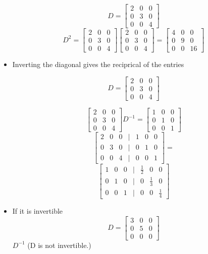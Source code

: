 \begin{itemize}
		\[D = \begin{bmatrix} 2 & 0 & 0 \\ 0 & 3 & 0 \\ 0 & 0 & 4 \end{bmatrix} \]
		\[D^2 = \begin{bmatrix} 2 & 0 & 0 \\ 0 & 3 & 0 \\ 0 & 0 & 4 \end{bmatrix}
		\begin{bmatrix} 2 & 0 & 0 \\ 0 & 3 & 0 \\ 0 & 0 & 4 \end{bmatrix}=
		\begin{bmatrix} 4 & 0 & 0 \\ 0 & 9 & 0 \\ 0 & 0 & 16 \end{bmatrix} \]

	\item Inverting the diagonal gives the reciprical of the entries

		\[D = \begin{bmatrix} 2 & 0 & 0 \\ 0 & 3 & 0 \\ 0 & 0 & 4 \end{bmatrix} \]

		\[\begin{bmatrix} 2 & 0 & 0 \\ 0 & 3 & 0 \\ 0 & 0 & 4 \end{bmatrix} D^{-1}	= \begin{bmatrix} 1 & 0 & 0 \\ 0 & 1 & 0 \\ 0 & 0 & 1 \end{bmatrix} \]
		\[\begin{bmatrix} 2 & 0 & 0 & | & 1 & 0 & 0  \\ 0 & 3 & 0 & | & 0 & 1 & 0 \\ 0 & 0 & 4 & | & 0 & 0 & 1 \end{bmatrix} =\]
		\[\begin{bmatrix} 1 & 0 & 0 & | & \frac{1}{2} & 0 & 0  \\ 0 & 1 & 0 & | & 0 & \frac{1}{3} & 0 \\ 0 & 0 & 1 & | & 0 & 0 & \frac{1}{4} \end{bmatrix} \]
	\item If it is invertible
		\[D = \begin{bmatrix}  3 & 0 & 0 \\ 0 & 5 & 0 \\ 0 & 0 & 0 \end{bmatrix} \]
		$D^{-1}$ (D is not invertible.)
\end{itemize}

